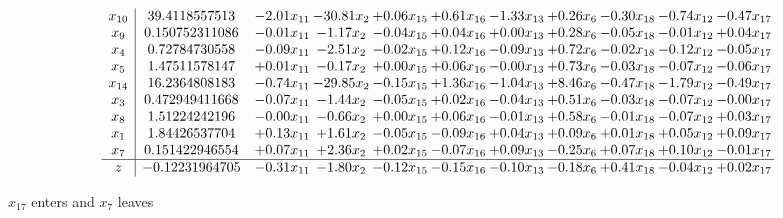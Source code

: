 \documentclass[9pt]{article}
\begin{document}
 \[\begin{array}{c| c c@{\hskip 2pt} c@{\hskip 2pt} c@{\hskip 2pt} c@{\hskip 2pt} c@{\hskip 2pt} c@{\hskip 2pt} c@{\hskip 2pt} c@{\hskip 2pt} c@{\hskip 2pt} }
 x_{10}   &  39.4118557513 & -2.01 x_{11} & -30.81 x_{2} & +  0.06 x_{15} & +  0.61 x_{16} & -1.33 x_{13} & +  0.26 x_{6} & -0.30 x_{18} & -0.74 x_{12} & -0.47 x_{17}\\
 x_{9}   &  0.150752311086 & -0.01 x_{11} & -1.17 x_{2} & -0.04 x_{15} & +  0.04 x_{16} & +  0.00 x_{13} & +  0.28 x_{6} & -0.05 x_{18} & -0.01 x_{12} & +  0.04 x_{17}\\
 x_{4}   &  0.72784730558 & -0.09 x_{11} & -2.51 x_{2} & -0.02 x_{15} & +  0.12 x_{16} & -0.09 x_{13} & +  0.72 x_{6} & -0.02 x_{18} & -0.12 x_{12} & -0.05 x_{17}\\
 x_{5}   &  1.47511578147 & +  0.01 x_{11} & -0.17 x_{2} & +  0.00 x_{15} & +  0.06 x_{16} & -0.00 x_{13} & +  0.73 x_{6} & -0.03 x_{18} & -0.07 x_{12} & -0.06 x_{17}\\
 x_{14}   &  16.2364808183 & -0.74 x_{11} & -29.85 x_{2} & -0.15 x_{15} & +  1.36 x_{16} & -1.04 x_{13} & +  8.46 x_{6} & -0.47 x_{18} & -1.79 x_{12} & -0.49 x_{17}\\
 x_{3}   &  0.472949411668 & -0.07 x_{11} & -1.44 x_{2} & -0.05 x_{15} & +  0.02 x_{16} & -0.04 x_{13} & +  0.51 x_{6} & -0.03 x_{18} & -0.07 x_{12} & -0.00 x_{17}\\
 x_{8}   &  1.51224242196 & -0.00 x_{11} & -0.66 x_{2} & +  0.00 x_{15} & +  0.06 x_{16} & -0.01 x_{13} & +  0.58 x_{6} & -0.01 x_{18} & -0.07 x_{12} & +  0.03 x_{17}\\
 x_{1}   &  1.84426537704 & +  0.13 x_{11} & +  1.61 x_{2} & -0.05 x_{15} & -0.09 x_{16} & +  0.04 x_{13} & +  0.09 x_{6} & +  0.01 x_{18} & +  0.05 x_{12} & +  0.09 x_{17}\\
 x_{7}   &  0.151422946554 & +  0.07 x_{11} & +  2.36 x_{2} & +  0.02 x_{15} & -0.07 x_{16} & +  0.09 x_{13} & -0.25 x_{6} & +  0.07 x_{18} & +  0.10 x_{12} & -0.01 x_{17}\\
\hline
z    &  -0.12231964705 & -0.31 x_{11} & -1.80 x_{2} & -0.12 x_{15} & -0.15 x_{16} & -0.10 x_{13} & -0.18 x_{6} & +  0.41 x_{18} & -0.04 x_{12} & +  0.02 x_{17}\\
\end{array}\]


 $ x_{17} $ enters and $ x_{7} $ leaves 
\end{document}
